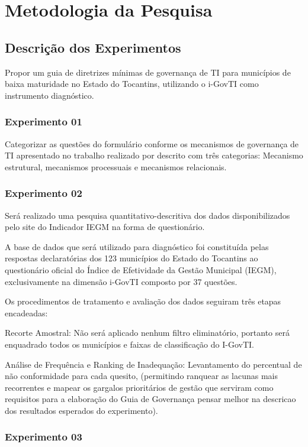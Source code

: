 
\mainmatter
\chapter{Metodologia da Pesquisa}\label{metodologia}

\section{Descrição dos Experimentos}
Propor um guia de diretrizes mínimas de governança de TI para municípios de baixa maturidade no 
Estado do Tocantins, utilizando o i-GovTI como instrumento diagnóstico. 

\subsection{Experimento 01}

Categorizar as questões do formulário conforme os mecanismos de governança de TI apresentado no
trabalho realizado por \cite{sengik_governanctecnologia_2022} descrito com três
categorias: Mecanismo estrutural, mecanismos processuais e mecanismos relacionais.


\subsection{Experimento 02}

Será realizado uma pesquisa quantitativo-descritiva dos dados disponibilizados pelo site do 
Indicador IEGM na forma de questionário. 

A base de dados que será utilizado para diagnóstico foi constituída pelas respostas declaratórias 
dos 123 municípios do Estado do Tocantins ao questionário oficial do Índice de Efetividade da Gestão 
Municipal (IEGM), exclusivamente na dimensão i-GovTI composto por 37 questões.

Os procedimentos de tratamento e avaliação dos dados seguiram três etapas encadeadas:

Recorte Amostral: Não será aplicado nenhum filtro eliminatório, portanto será enquadrado 
todos os municípios e faixas de classificação do I-GovTI.

Análise de Frequência e Ranking de Inadequação: Levantamento do percentual de não conformidade para 
cada quesito, (permitindo ranquear as lacunas mais recorrentes e mapear os gargalos prioritários de 
gestão que serviram como requisitos para a elaboração do Guia de Governança {pensar melhor na
descricao dos resultados esperados do experimento}).

\subsection{Experimento 03}
